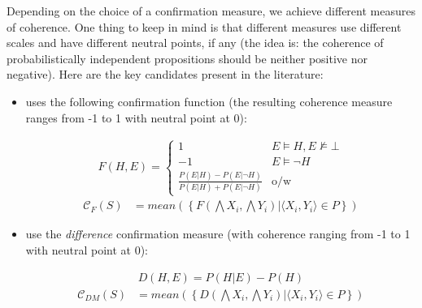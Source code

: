 \documentclass[10pt,]{scrartcl}
\begin{document}
\noindent Depending on the choice of a confirmation measure, we achieve
different measures of coherence.  One thing to keep in mind is
that different measures use different scales and have different neutral points, if any (the idea is: the coherence of probabilistically independent propositions should be neither positive nor
negative). Here are the key candidates present in the literature:

\begin{itemize}

\item \citet{fitelson2003ProbabilisticTheoryCoherence}   uses the following confirmation function (the resulting coherence measure ranges from -1 to 1 with neutral point at 0):

\begin{align*}
    F(H,E) = \begin{cases}
    1 & E\models H, E\not \models \bot \\
    -1 & E \models \neg H\\
    \frac{P(E|H)-P(E|\neg H)}{P(E|H)+P(E|\neg H)} & \mbox{o/w}
    \end{cases}
\end{align*}
\begin{align}
\tag{Fitelson}  
    \mathcal{C}_{F}(S) & =
mean\left(\left\{F(\bigwedge X_i, \bigwedge Y_i) | \langle X_i, Y_i\rangle \in P\right\} \right)
\end{align}






\item  \citet{Douven2007measuring}  use the \textit{difference} confirmation measure (with coherence ranging from -1 to 1 with neutral point at 0):

\begin{align*}
    D(H,E) = P(H|E) - P(H)
\end{align*}
\begin{align}
\tag{DM}  
    \mathcal{C}_{DM}(S) & =
mean\left(\left\{D(\bigwedge X_i, \bigwedge Y_i) | \langle X_i, Y_i\rangle \in P\right\} \right)
\end{align}


\end{itemize}
\end{document}
